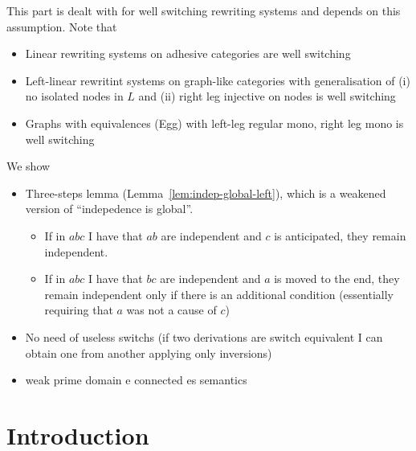 \documentclass[a4paper,UKenglish,cleveref,pdftex, thm-restate,numberwithinsect,anonymous]{lipics}
\begin{document}
This part is dealt with for well switching rewriting systems and depends on this assumption. Note that
\begin{itemize}
\item Linear rewriting systems on adhesive categories are well switching
\item Left-linear rewritint systems on graph-like categories with generalisation of (i) no isolated nodes in $L$ and (ii) right leg injective on nodes is well switching
\item Graphs with equivalences (Egg) with left-leg regular mono, right leg mono is well switching
\end{itemize}

We show
\begin{itemize}
  

\item Three-steps lemma (Lemma~\ref{lem:indep-global-left}), which is a weakened version of ``indepedence is global''.
  \begin{itemize}
    
  \item If in $abc$ I have that $ab$ are independent and $c$ is anticipated, they remain independent.
  \item  If in $abc$ I have that $bc$ are independent and $a$ is moved to the end, they remain independent only if there is an additional condition (essentially requiring that $a$ was not a cause of $c$)
  \end{itemize}

  
  
\item No need of useless switchs (if two derivations are switch equivalent I can obtain one from another applying only inversions)
  
\item weak prime domain e connected es semantics
\end{itemize}
\fi

\section{Introduction}

%
\end{document}
